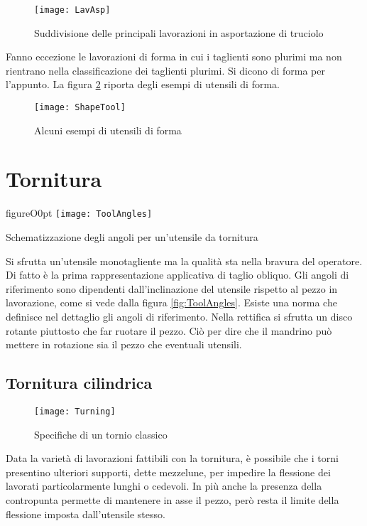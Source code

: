 \begin{figure}
\centering
\texttt{[image: LavAsp]}
\caption{Suddivisione delle principali lavorazioni in asportazione di truciolo}
\label{fig:LavAsp}
\end{figure}

Fanno eccezione le lavorazioni di forma in cui i taglienti sono plurimi ma non rientrano nella classificazione dei taglienti plurimi. Si dicono di forma per l'appunto.
La figura \ref{fig:ShapeTool} riporta degli esempi di utensili di forma.

\begin{figure}
\centering
\texttt{[image: ShapeTool]}
\caption{Alcuni esempi di utensili di forma}
\label{fig:ShapeTool}
\end{figure}

\chapter{Tornitura}
\begin{wrapfloat}{figure}{O}{0pt}
\texttt{[image: ToolAngles]}
\caption{Schematizzazione degli angoli per un'utensile da tornitura}
\label{fig:ToolAngles}
\end{wrapfloat}

Si sfrutta un'utensile monotagliente ma la qualità sta nella bravura del operatore.
Di fatto è la prima rappresentazione applicativa di taglio obliquo.
Gli angoli di riferimento sono dipendenti dall'inclinazione del utensile rispetto al pezzo in lavorazione, come si vede dalla figura \ref{fig:ToolAngles}.
Esiste una norma che definisce nel dettaglio gli angoli di riferimento.
Nella rettifica si sfrutta un disco rotante piuttosto che far ruotare il pezzo.
Ciò per dire che il mandrino può mettere in rotazione sia il pezzo che eventuali utensili.

\section{Tornitura cilindrica}
\begin{figure}
\centering
\texttt{[image: Turning]}
\caption{Specifiche di un tornio classico}
\label{fig:Turning}
\end{figure}
Data la varietà di lavorazioni fattibili con la tornitura, è possibile che i torni presentino ulteriori supporti, dette mezzelune, per impedire la flessione dei lavorati particolarmente lunghi o cedevoli.
In più anche la presenza della contropunta permette di mantenere in asse il pezzo, però resta il limite della flessione imposta dall'utensile stesso.

